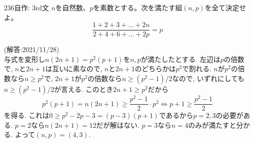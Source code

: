 \begin{thm}{236}{}{自作: 3rd文}
 $n$を自然数、$p$を素数とする。次を満たす組$(n,p)$を全て決定せよ。\\
 \[ \frac{1+2+3+\dots+2n}{2+4+6+\dots+2p}=p \]
\end{thm}
(解答:2021/11/28) \\
与式を変形し$n(2n+1) = p^2(p+1)$を$n,p$が満たしたとする. 左辺は$p$の倍数で, $n$と$2n+1$は互いに素なので, $n$と$2n+1$のどちらかは$p^2$で割れる. $n$が$p^2$の倍数なら$n\geq p^2$で, $2n+1$が$p^2$の倍数なら$n\geq (p^2-1)/2$なので, いずれにしても$n\geq (p^2-1)/2$が言える. このとき$2n+1 \geq p^2$だから
\[p^2(p+1) = n(2n+1) \geq \dfrac{p^2-1}{2}\cdot p^2 \iff p+1\geq \dfrac{p^2-1}{2}\]
を得る. これは$0\geq p^2 - 2p -3 = (p-3)(p+1)$であるから$p=2,3$の必要がある. $p=2$なら$n(2n+1) = 12$だが解はない. $p=3$なら$n=4$のみが満たすと分かる. よって$(n,p) = (4,3)$. 